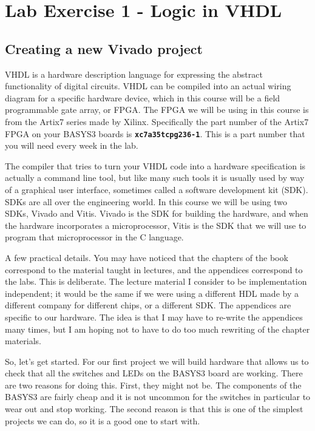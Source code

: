 \documentclass[../physical_computing.tex]{subfiles}
\begin{document}
\chapter{Lab Exercise 1 - Logic in VHDL}
\label{sec:appendix_2}

\section{Creating a new Vivado project}
\label{sec:create_new_vivado_project}

VHDL is a hardware description language for expressing the abstract functionality of digital circuits. VHDL can be compiled into an actual wiring diagram for a specific hardware device, which in this course will be a field programmable gate array, or FPGA. The FPGA we will be using in this course is from the Artix7 series made by Xilinx. Specifically the part number of the Artix7 FPGA on your BASYS3 boards is \texttt{\bf xc7a35tcpg236-1}. This is a part number that you will need every week in the lab. 

The compiler that tries to turn your VHDL code into a hardware specification is actually a command line tool, but like many such tools it is usually used by way of a graphical user interface, sometimes called a software development kit (SDK). SDKs are all over the engineering world. In this course we will be using two SDKs, Vivado and Vitis. Vivado is the SDK for building the hardware, and when the hardware incorporates a microprocessor, Vitis is the SDK that we will use to program that microprocessor in the C language.

A few practical details. You may have noticed that the chapters of the book correspond to the material taught in lectures, and the appendices correspond to the labs. This is deliberate. The lecture material I consider to be implementation independent; it would be the same if we were using a different HDL made by a different company for different chips, or a different SDK. The appendices are specific to our hardware. The idea is that I may have to re-write the appendices many times, but I am hoping not to have to do too much rewriting of the chapter materials.

So, let's get started. For our first project we will build hardware that allows us to check that all the switches and LEDs on the BASYS3 board are working. There are two reasons for doing this. First, they might not be. The components of the BASYS3 are fairly cheap and it is not uncommon for the switches in particular to wear out and stop working. The second reason is that this is one of the simplest projects we can do, so it is a good one to start with.
\end{document}
